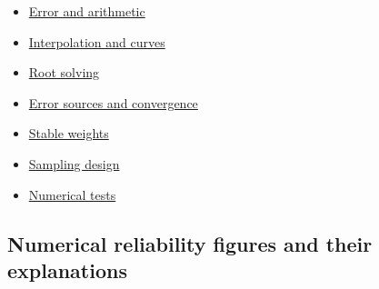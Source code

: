 \begin{itemize}
\tightlist
\item
  \href{Continuous\%20Notes/Computing\%20Foundations\%20-\%20From\%20Bits\%20to\%20C++\%20and\%20Systems\%20APIs\#Floating-point\%20answers:\%20error,\%20conditioning,\%20stability,\%20and\%20stable\%20arithmetic}{Error and arithmetic}
\item
  \href{Continuous\%20Notes/Computing\%20Foundations\%20-\%20From\%20Bits\%20to\%20C++\%20and\%20Systems\%20APIs\#Reconstructing\%20values\%20and\%20curves\%20between\%20samples}{Interpolation and curves}
\item
  \href{Continuous\%20Notes/Computing\%20Foundations\%20-\%20From\%20Bits\%20to\%20C++\%20and\%20Systems\%20APIs\#Finding\%20roots\%20with\%20guarantees\%20and\%20convergence\%20checks}{Root solving}
\item
  \href{Continuous\%20Notes/Computing\%20Foundations\%20-\%20From\%20Bits\%20to\%20C++\%20and\%20Systems\%20APIs\#Separate\%20discretization,\%20truncation,\%20and\%20roundoff;\%20measure\%20convergence}{Error sources and convergence}
\item
  \href{Continuous\%20Notes/Computing\%20Foundations\%20-\%20From\%20Bits\%20to\%20C++\%20and\%20Systems\%20APIs\#Keep\%20probability\%20weights\%20stable\%20before\%20sampling}{Stable weights}
\item
  \href{Continuous\%20Notes/Computing\%20Foundations\%20-\%20From\%20Bits\%20to\%20C++\%20and\%20Systems\%20APIs\#Design\%20samples:\%20without\%20replacement,\%20stratified,\%20and\%20low-discrepancy}{Sampling design}
\item
  \href{Continuous\%20Notes/Computing\%20Foundations\%20-\%20From\%20Bits\%20to\%20C++\%20and\%20Systems\%20APIs\#Test\%20numerical\%20methods\%20and\%20benchmark\%20reproducibly}{Numerical tests}
\end{itemize}

\subsection{Numerical reliability figures and their explanations}\label{numerical-reliability-figures-and-their-explanations}

